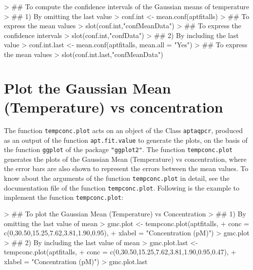 \documentclass[11pt]{article}
\newcommand{\code}[1]{{\tt #1}}
\newcommand{\pkg}[1]{{\tt "#1"}}
\begin{document}
\begin{Schunk}
\begin{Sinput}
> ## To compute the confidence intervals of the Gaussian means of temperature
> ## 1) By omitting the last value
> conf.int <- mean.conf(aptfitalls)
> ## To express the mean values
> slot(conf.int,"confMeanData")
> ## To express the confidence intervals
> slot(conf.int,"confData")
> ## 2) By including the last value
> conf.int.last <- mean.conf(aptfitalls, mean.all = "Yes")
> ## To express the mean values
> slot(conf.int.last,"confMeanData")
\end{Sinput}
\end{Schunk}

\section{Plot the Gaussian Mean (Temperature) vs concentration}
The function \code{tempconc.plot} acts on an object of the Class \code{aptaqpcr}, produced as an output of the function \code{apt.fit.value} to generate the plots, on the basis of the function \code{ggplot} of the package \pkg{ggplot2}. The function \code{tempconc.plot} generates the plots of the Gaussian Mean (Temperature) vs concentration, where the error bars are also shown to represent the errors between the mean values. To know about the arguments of the function \code{tempconc.plot} in detail, see the documentation file of the function \code{tempconc.plot}. Following is the example to implement the function \code{tempconc.plot}:

\begin{Schunk}
\begin{Sinput}
> ## To plot the Gaussian Mean (Temperature) vs Concentration
> ## 1) By omitting the last value of mean
> gmc.plot <- tempconc.plot(aptfitalls,
+                           conc = c(0,30.50,15.25,7.62,3.81,1.90,0.95),
+                           xlabel = "Concentration (pM)")
> gmc.plot
> ## 2) By including the last value of mean
> gmc.plot.last <- tempconc.plot(aptfitalls,
+                                conc =  c(0,30.50,15.25,7.62,3.81,1.90,0.95,0.47),
+                                xlabel = "Concentration (pM)")
> gmc.plot.last
\end{Sinput}
\end{Schunk}


\end{document}
